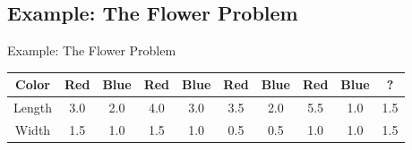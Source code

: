 \documentclass[mathserif]{beamer}
\begin{document}
\subsection{Example: The Flower Problem}
\begin{frame}{Example: The Flower Problem}
\begin{table}
\centering
\begin{tabular}{|c|c|c|c|c|c|c|c|c|c|}
\hline
Color & Red & Blue & Red & Blue & Red & Blue & Red & Blue & ?\\\hline
Length & 3.0 & 2.0 & 4.0 & 3.0 & 3.5 & 2.0 & 5.5 & 1.0 & 1.5\\\hline
Width & 1.5 & 1.0 & 1.5 & 1.0 & 0.5 & 0.5 & 1.0 & 1.0 & 1.5 \\\hline
\end{tabular}
\end{table}


\end{frame}
\end{document}
